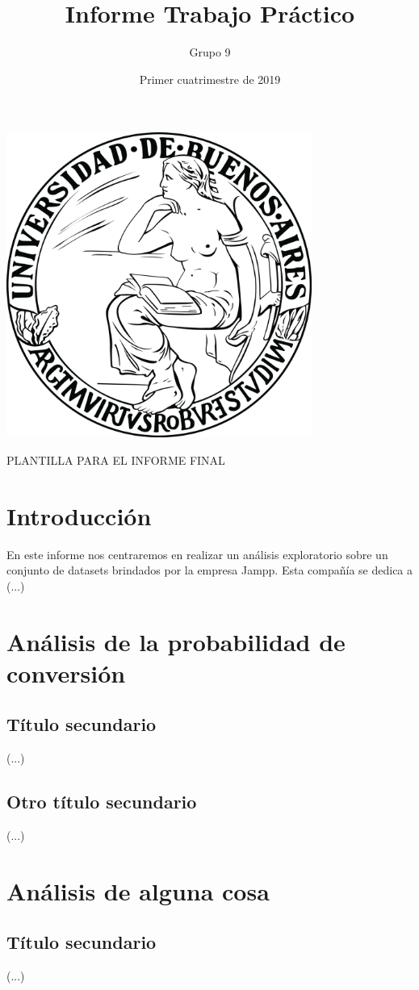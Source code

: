 \documentclass{article}
\title{Informe Trabajo Práctico}
\author{Grupo 9}
\date{Primer cuatrimestre  de 2019}
\begin{document}
\maketitle

\vspace{6mm}

\begin{center}
    
\includegraphics[width=10cm, height=10cm]{UBA.png}

\end{center}

PLANTILLA PARA EL INFORME FINAL

\newpage

\section{Introducción}
\vspace{3mm}
En este informe nos centraremos en realizar un análisis exploratorio sobre un conjunto de datasets brindados por la empresa Jampp. Esta compañía se dedica a (...)


\maketitle

\section{Análisis de la probabilidad de conversión}
\vspace{3mm}
\subsection{Título secundario}
(...)
\subsection{Otro título secundario}
(...)


\section{Análisis de alguna cosa}
\subsection{Título secundario}
(...)
\end{document}
